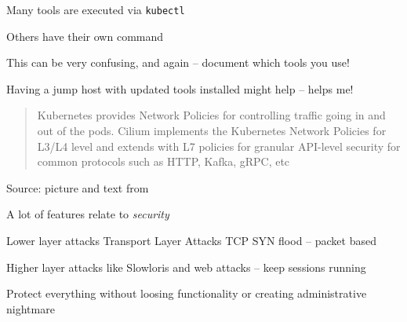 \documentclass[Screen16to9,17pt]{foils}
\begin{document}
\begin{list2}
\item Many tools are executed via \verb+kubectl+
\item Others have their own command
\item This can be very confusing, and again -- document which tools you use!
\item Having a jump host with updated tools installed might help -- helps me!
\end{list2}



\begin{quote}
Kubernetes provides Network Policies for controlling traffic going in and out of the pods. Cilium implements the Kubernetes Network Policies for L3/L4 level and extends with L7 policies for granular API-level security for common protocols such as HTTP, Kafka, gRPC, etc
\end{quote}
Source: picture and text from 




\begin{list2}
\item A lot of features relate to \emph{security}
\end{list2}








\begin{list2}
\item Lower layer attacks Transport Layer Attacks TCP SYN flood -- packet based
\item Higher layer attacks like Slowloris and web attacks -- keep sessions running
\item Protect everything without loosing functionality or creating administrative nightmare
\end{list2}

\end{document}
